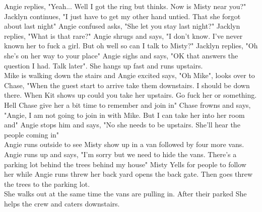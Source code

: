 \documentclass{article}[12px]
\begin{document}
	Angie replies, "Yeah... Well I got the ring but thinks. Now is Misty near you?" Jacklyn continues, "I just have to get my other hand untied. That she forgot about last night" Angie confused asks, "She let you stay last night?" Jacklyn replies, "What is that rare?" Angie shrugs and says, "I don't know. I've never known her to fuck a girl. But oh well so can I talk to Misty?" Jacklyn replies, "Oh she's on her way to your place" Angie sighs and says, "OK that answers the question I had. Talk later". She hangs up fast and runs upstairs. \\

	Mike is walking down the stairs and Angie excited says, "Oh Mike", looks over to Chase, "When the guest start to arrive take them downstairs. I should be down there. When Kit shows up could you take her upstairs. Go fuck her or something. Hell Chase give her a bit time to remember and join in" Chase frowns and says, "Angie, I am not going to join in with Mike. But I can take her into her room and" Angie stops him and says, "No she needs to be upstairs. She'll hear the people coming in" \\

	Angie runs outside to see Misty show up in a van followed by four more vans. Angie runs up and says, "I'm sorry but we need to hide the vans. There's a parking lot behind the trees behind my house" Misty Yells for people to follow her while Angie runs threw her back yard opens the back gate. Then goes threw the trees to the parking lot.\\

	She walks out at the same time the vans are pulling in. After their parked She helps the crew and caters downstairs.\\
\end{document}
